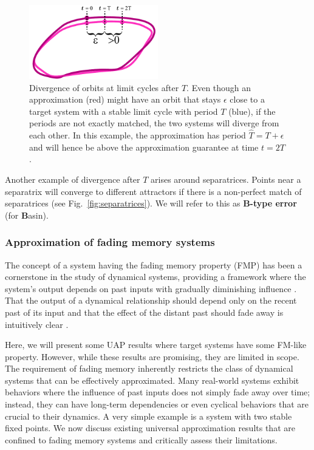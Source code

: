 \documentclass{article}
\theoremstyle{definition}
\theoremstyle{remark}
\newcounter{ct}
\begin{document}
\setlength\belowcaptionskip{-5ex}
\begin{figure}
  \centering
  \includegraphics[width=0.5\textwidth]{lc_period_div}
  \caption{Divergence of orbits at limit cycles after $T$.
  Even though an approximation (red) might have an orbit that stays $\epsilon$ close to a target system with a stable limit cycle with period $T$ (blue), if the periods are not exactly matched, the two systems will diverge from each other.
  In this example, the approximation has period $\hat{T} = T+\epsilon$ and will hence be above the approximation guarantee at time $t=2T$.
  }\label{fig:lc_period_div}
\end{figure}

Another example of divergence after $T$ arises around separatrices.
Points near a separatrix will converge to different attractors if there is a non-perfect match of separatrices (see Fig.~\ref{fig:separatrices}).
We will refer to this as \textbf{B-type error} (for \textbf{B}asin).



\subsubsection{Approximation of fading memory systems}\label{sec:fadingmemory}
The concept of a system having the fading memory property (FMP) has been a cornerstone in the study of dynamical systems\citep{coleman1968general}, providing a framework where the system’s output depends on past inputs with gradually diminishing influence \citep{boyd1985fading}.
That the output of a dynamical relationship should depend only on the recent past of its input and that the effect of the distant past should fade away is intuitively clear  \citep{sepulchre2021fading}.

Here, we will present some UAP results where target systems have some FM-like property.
However, while these results are promising, they are limited in scope.
The requirement of fading memory inherently restricts the class of dynamical systems that can be effectively approximated.
Many real-world systems exhibit behaviors where the influence of past inputs does not simply fade away over time; instead, they can have long-term dependencies or even cyclical behaviors that are crucial to their dynamics.
A very simple example is a system with two stable fixed points.
We now discuss existing universal approximation results that are confined to fading memory systems and critically assess their limitations.
\end{document}
